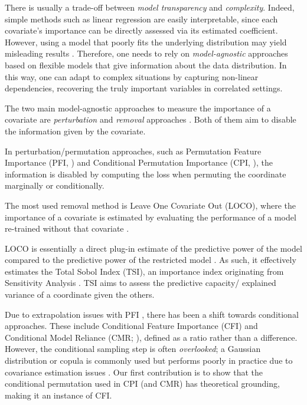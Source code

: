 \documentclass{article}
\theoremstyle{plain}
\theoremstyle{definition}
\theoremstyle{remark}
\begin{document}
There is usually a trade-off between \textit{model transparency} and \textit{complexity}.
%
Indeed, simple methods such as linear regression are easily interpretable, since each covariate's importance can be directly assessed via its estimated coefficient. However, using a model that poorly fits the underlying distribution may yield misleading results \citep{molnar2021general}.
%
Therefore, one needs to rely on \textit{model-agnostic} approaches based on flexible models that give information about the data distribution. 
%
In this way, one can adapt to complex situations by capturing non-linear dependencies, recovering the truly important variables in correlated settings.%

The two main model-agnostic approaches to measure the importance of a covariate are \textit{perturbation} and \textit{removal} approaches \citep{covert}. Both of them aim to disable the information given by the covariate.

In perturbation/permutation approaches, such as Permutation Feature Importance (PFI, \citet{Mi2021}) and Conditional Permutation Importance (CPI, \citet{chamma2024statistically}), the information is disabled by computing the loss when permuting the coordinate marginally or conditionally.

The most used removal method is Leave One Covariate Out (LOCO), where the importance of a covariate is estimated by evaluating the performance of a model re-trained without that covariate \citep{lei2018,williamson2021}. 
%
%

LOCO is essentially a direct plug-in estimate of the predictive power of the model compared to the predictive power of the restricted model \citep{williamson2023general}. 
%
As such, it effectively estimates the Total Sobol Index (TSI), an importance index originating from Sensitivity Analysis \citep{first-total-order-effects}. 
%
TSI aims to assess the predictive capacity/ explained variance of a coordinate given the others.%

Due to extrapolation issues with PFI \citep{Hooker2021}, there has been a shift towards conditional approaches. These include Conditional Feature Importance (CFI) \cite{Strobl2008} and Conditional Model Reliance (CMR; \citet{fisher2019all}), defined as a ratio rather than a difference. However, the conditional sampling step is often \textit{overlooked}; a Gaussian distribution or copula is commonly used but performs poorly in practice due to covariance estimation issues \citep{blain2025knockoffsfaildiagnosingfixing}. Our first contribution is to show that the conditional permutation used in CPI (and CMR) has theoretical grounding, making it an instance of CFI.
\end{document}
